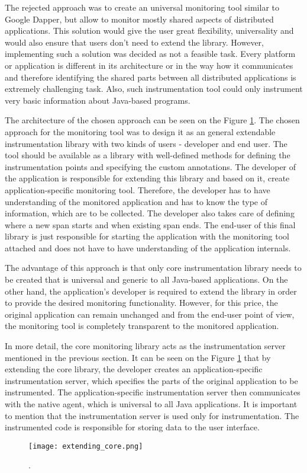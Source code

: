 The rejected approach was to create an universal monitoring tool similar to Google Dapper, but allow to monitor mostly shared aspects of distributed applications. This solution would give the user great flexibility, universality and would also ensure that users don't need to extend the library. However, implementing such a solution was decided as not a feasible task. Every platform or application is different in its architecture or in the way how it communicates and therefore identifying the shared parts between all distributed applications is extremely challenging task. Also, such instrumentation tool could only instrument very basic information about Java-based programs.

The architecture of the chosen approach can be seen on the Figure \ref{fig:extending_core}. The chosen approach for the monitoring tool was to design it as an general extendable instrumentation library with two kinds of users - developer and end user. The tool should be available as a library with well-defined methods for defining the instrumentation points and specifying the custom annotations. The developer of the application is responsible for extending this library and based on it, create application-specific monitoring tool. Therefore, the developer has to have understanding of the monitored application and has to know the type of information, which are to be collected. The developer  also takes care of defining where a new span starts and when existing span ends. The end-user of this final library is just responsible for starting the application with the monitoring tool attached and does not have to have understanding of the application internals.

The advantage of this approach is that only core instrumentation library needs to be created that is universal and generic to all Java-based applications. On the other hand, the application's developer is required to extend the library in order to provide the desired monitoring functionality. However, for this price, the original application can remain unchanged and from the end-user point of view, the monitoring tool is completely transparent to the monitored application.

In more detail, the core monitoring library acts as the instrumentation server mentioned in the previous section. It can be seen on the Figure \ref{fig:extending_core} that by extending the core library, the developer creates an application-specific instrumentation server, which specifies the parts of the original application to be instrumented. The application-specific instrumentation server then communicates with the native agent, which is universal to all Java applications. It is important to mention that the instrumentation server is used only for instrumentation. The instrumented code is responsible for storing data to the user interface.
\begin{figure}
	\centering
	\texttt{[image: extending\_core.png]}
	\caption{.}
	\label{fig:extending_core}
\end{figure}


